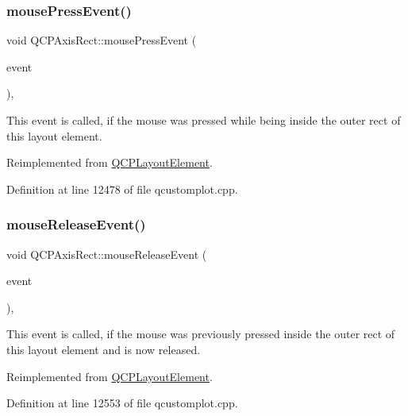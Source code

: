 \subsubsection{\texorpdfstring{mouse\+Press\+Event()}{mousePressEvent()}}
{\footnotesize\ttfamily void Q\+C\+P\+Axis\+Rect\+::mouse\+Press\+Event (\begin{DoxyParamCaption}\item[{Q\+Mouse\+Event $\ast$}]{event }\end{DoxyParamCaption})\hspace{0.3cm}{\ttfamily [protected]}, {\ttfamily [virtual]}}

This event is called, if the mouse was pressed while being inside the outer rect of this layout element. 

Reimplemented from \hyperlink{class_q_c_p_layout_element_a2d82ea21fe0ee628f177bd824bc51a71}{Q\+C\+P\+Layout\+Element}.



Definition at line 12478 of file qcustomplot.\+cpp.

\mbox{\label{class_q_c_p_axis_rect_adf6c99780cea55ab39459a6eaad3a94a}} 
\subsubsection{\texorpdfstring{mouse\+Release\+Event()}{mouseReleaseEvent()}}
{\footnotesize\ttfamily void Q\+C\+P\+Axis\+Rect\+::mouse\+Release\+Event (\begin{DoxyParamCaption}\item[{Q\+Mouse\+Event $\ast$}]{event }\end{DoxyParamCaption})\hspace{0.3cm}{\ttfamily [protected]}, {\ttfamily [virtual]}}

This event is called, if the mouse was previously pressed inside the outer rect of this layout element and is now released. 

Reimplemented from \hyperlink{class_q_c_p_layout_element_ae526ac828cce1e5bb94eaa85776d7404}{Q\+C\+P\+Layout\+Element}.



Definition at line 12553 of file qcustomplot.\+cpp.

\mbox{\label{class_q_c_p_axis_rect_a587d073a97b27bc7293fab4b2774ad59}} 
